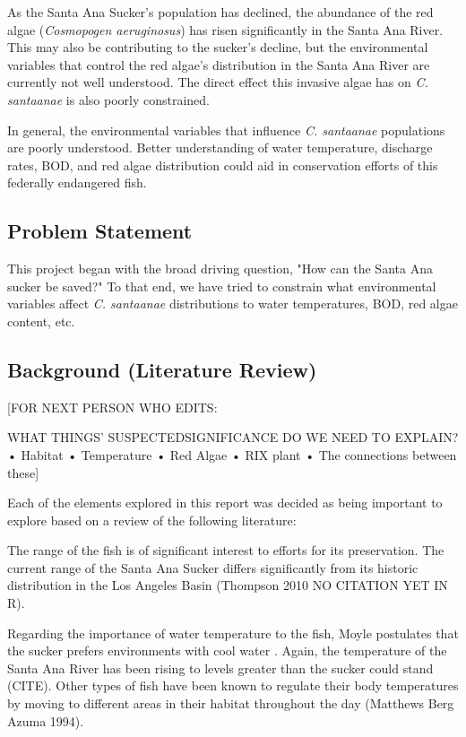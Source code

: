 \documentclass{article}\usepackage[]{graphicx}\usepackage[]{color}
\begin{document}
As the Santa Ana Sucker's population has declined, the abundance of the red algae (\emph{Cosmopogen aeruginosus}) has risen significantly in the Santa Ana River. This may also be contributing to the sucker's decline, but the environmental variables that control the red algae's distribution in the Santa Ana River are currently not well understood. The direct effect this invasive algae has on \emph{C. santaanae} is also poorly constrained. 

In general, the environmental variables that influence \emph{C. santaanae} populations are poorly understood. Better understanding of water temperature, discharge rates, BOD, and red algae distribution could aid in conservation efforts of this federally endangered fish. 


\subsection{Problem Statement}

This project began with the broad driving question, "How can the Santa Ana sucker be saved?" To that end, we have tried to constrain what environmental variables affect \emph{C. santaanae} distributions to water temperatures, BOD, red algae content, etc. 

\subsection{Background (Literature Review)}

[FOR NEXT PERSON WHO EDITS: 

WHAT THINGS' SUSPECTEDSIGNIFICANCE DO WE NEED TO EXPLAIN? 
•	Habitat 
•	Temperature 
•	Red Algae
•	RIX plant
•	The connections between these]


Each of the elements explored in this report was decided as being important to explore based on a review of the following literature:

The range of the fish is of significant interest to efforts for its preservation. The current range of the Santa Ana Sucker differs significantly from its historic distribution in the Los Angeles Basin (Thompson 2010 NO CITATION YET IN R).

Regarding the importance of water temperature to the fish, Moyle postulates that the sucker prefers environments with cool water \citep{moyle2002inland}. Again, the temperature of the Santa Ana River has been rising to levels greater than the sucker could stand (CITE). Other types of fish have been known to regulate their body temperatures by moving to different areas in their habitat throughout the day (Matthews Berg Azuma 1994).
\end{document}
